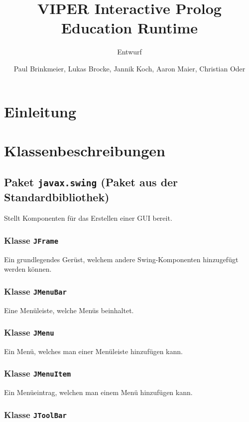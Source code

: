 \documentclass[parskip=full,11pt,twoside]{scrartcl}
\title{VIPER Interactive Prolog Education Runtime}
\subtitle{Entwurf}
\author{Paul Brinkmeier, Lukas Brocke, Jannik Koch, Aaron Maier, Christian Oder}
\begin{document}
\maketitle

\section{Einleitung}

\section{Klassenbeschreibungen}

\subsection{Paket \texttt{javax.swing} (Paket aus der Standardbibliothek)}

Stellt Komponenten für das Erstellen einer GUI bereit.

\subsubsection{Klasse \texttt{JFrame}}

Ein grundlegendes Gerüst, welchem andere Swing-Komponenten hinzugefügt werden können.

\subsubsection{Klasse \texttt{JMenuBar}}

Eine Menüleiste, welche Menüs beinhaltet.

\subsubsection{Klasse \texttt{JMenu}}

Ein Menü, welches man einer Menüleiste hinzufügen kann.

\subsubsection{Klasse \texttt{JMenuItem}}

Ein Menüeintrag, welchen man einem Menü hinzufügen kann.

\subsubsection{Klasse \texttt{JToolBar}}
\end{document}
